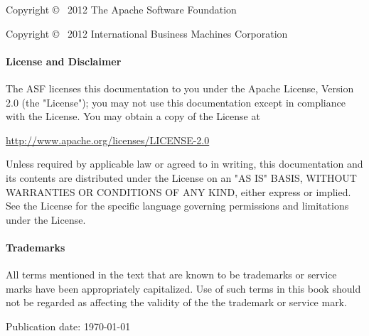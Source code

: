 
%
%
Copyright \copyright~ 2012 The Apache Software Foundation

Copyright \copyright~ 2012 International Business Machines Corporation

{\addtolength{\leftskip}{10 mm}
     \paragraph{License and Disclaimer}
     The ASF licenses this documentation to you under the Apache License, Version 2.0 (the "License");
     you may not use this documentation except in compliance with the License.  You may obtain a copy of
     the License at
              
     \url{http://www.apache.org/licenses/LICENSE-2.0}
     
     Unless required by applicable law or agreed to in writing, this documentation and its contents are
     distributed under the License on an "AS IS" BASIS, WITHOUT WARRANTIES OR CONDITIONS OF ANY KIND,
     either express or implied.  See the License for the specific language governing permissions and
     limitations under the License.

     \paragraph{Trademarks}     
     All terms mentioned in the text that are known to be trademarks or service marks have been
     appropriately capitalized.  Use of such terms in this book should not be regarded as affecting the
     validity of the the trademark or service mark.

}

\vspace{.5in}


Publication date: \mydate\today
